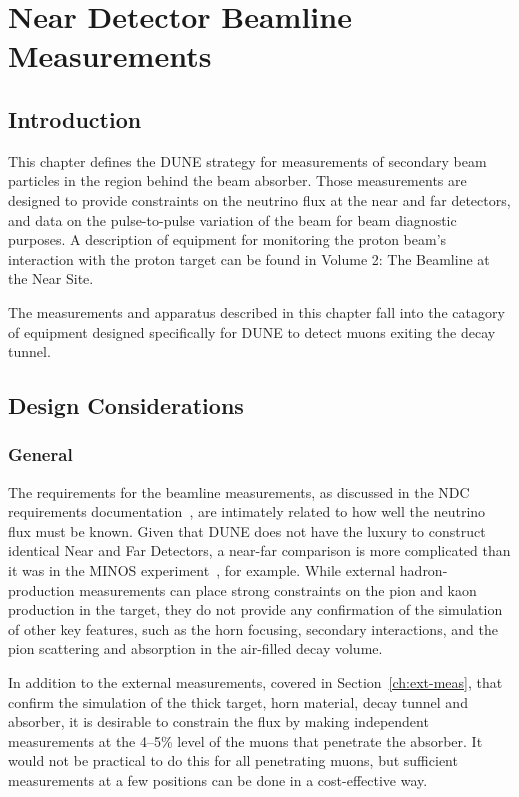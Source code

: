 \chapter{Near Detector Beamline Measurements}
\label{ch:nd-blm}


\section{Introduction}
\label{sec:nd-blm-intro}

This chapter defines the DUNE strategy for measurements of secondary
beam particles in the region behind the beam absorber. 
Those measurements are designed to provide constraints 
on the neutrino flux at the near and far
detectors, and data on the pulse-to-pulse variation
of the beam for beam diagnostic purposes. A description of equipment
for monitoring the proton beam's interaction with the proton target
can be found in Volume 2: The Beamline at the Near Site. 

The measurements and apparatus described in this chapter fall into
the catagory of equipment designed specifically for DUNE to
detect muons exiting the decay tunnel. 

\section{Design Considerations}
\label{sec:nd-blm-design}

\subsection{General}
The requirements for the beamline measurements, 
as discussed in the NDC requirements documentation~\cite{nd_requirements_doc}, are intimately related to how well the neutrino flux must be known.
Given that DUNE does not have the luxury to construct identical Near and Far Detectors, 
a near-far comparison is more complicated than it was in
the MINOS experiment~\cite{gnumi-validation}, for example.   
While external hadron-production measurements can place strong constraints on the pion and kaon production in the target,
they do not provide any confirmation of the simulation of other key features, such as the horn focusing, secondary interactions, and the pion scattering and absorption in the air-filled decay volume. 

In addition to the external measurements, covered in Section~\ref{ch:ext-meas}, 
that confirm
the simulation of the thick target, horn material, decay tunnel and
absorber, it is desirable to constrain the flux by making independent
measurements at the 4--5\%
level of the muons that penetrate the absorber. It would not be practical to do this for all penetrating
muons, but sufficient measurements at a few positions can be done in a 
cost-effective way. 

